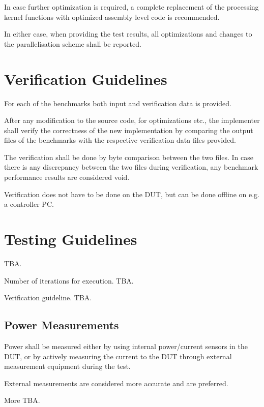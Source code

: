 In case further optimization is required, a complete replacement of the processing kernel functions with optimized assembly level code is recommended. 

In either case, when providing the test results, all optimizations and changes to the parallelisation scheme shall be reported.

\section{Verification Guidelines}
For each of the benchmarks both input and verification data is provided.

After any modification to the source code, for optimizations etc., the implementer shall verify the correctness of the new implementation by comparing the output files of the benchmarks with the respective verification data files provided. 

The verification shall be done by byte comparison between the two files. In case there is any discrepancy between the two files during verification, any benchmark performance results are considered void. 

Verification does not have to be done on the DUT, but can be done offline on e.g. a controller PC. 

\section{Testing Guidelines}

TBA.

Number of iterations for execution. TBA. 

Verification guideline. TBA.

\subsection{Power Measurements}
Power shall be measured either by using internal power/current sensors in the DUT, or by actively measuring the current to the DUT through external measurement equipment during the test.

External measurements are considered more accurate and are preferred. 

More TBA.
